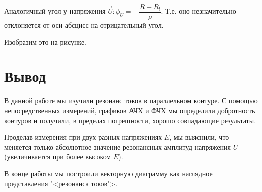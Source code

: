 \documentclass[a4paper, 12pt]{article}
\begin{document}
            Аналогичный угол у напряжения $ \vec{U}: \phi_U = - \dfrac{R + R_l}{\rho} $. Т.е. оно незначительно отклоняется от оси абсцисс на отрицательный угол.

            Изобразим это на рисунке.

    \section{Вывод}

        В данной работе мы изучили резонанс токов в параллельном контуре. С помощью непосредственных измерений, графиков АЧХ и ФЧХ мы определили добротность контуров и получили, в пределах погрешности, хорошо совпадающие результаты.

        Проделав измерения при двух разных напряжениях $ E $, мы выяснили, что меняется только абсолютное значение резонансных амплитуд напряжения $ U $ (увеличивается при более высоком $ E $).

        В конце работы мы построили векторную диаграмму как наглядное представления "<резонанса токов">.
\end{document}

